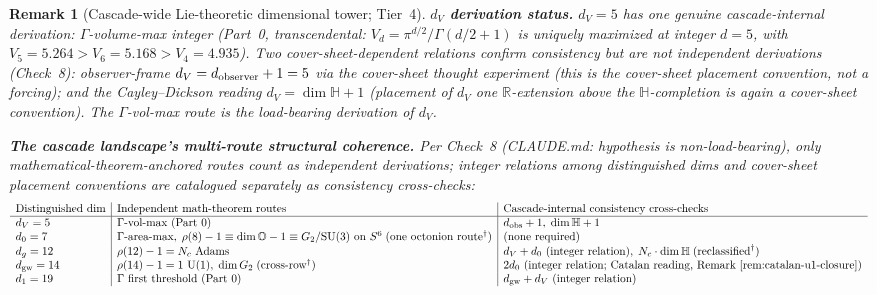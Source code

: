\documentclass[12pt,a4paper]{article}
\newtheorem*{remark}{Remark}
\begin{document}
\begin{remark}[Cascade-wide Lie-theoretic dimensional tower; Tier~4]
\medskip\noindent\textbf{$d_V$ derivation status.} $d_V = 5$ has one genuine cascade-internal derivation: $\Gamma$-volume-max integer (Part~0, transcendental: $V_d = \pi^{d/2}/\Gamma(d/2+1)$ is uniquely maximized at integer $d=5$, with $V_5 = 5.264 > V_6 = 5.168 > V_4 = 4.935$). Two cover-sheet-dependent relations confirm consistency but are \emph{not} independent derivations (Check~8): observer-frame $d_V = d_{\rm observer} + 1 = 5$ via the cover-sheet thought experiment (this is the cover-sheet placement convention, not a forcing); and the Cayley--Dickson reading $d_V = \dim\mathbb{H} + 1$ (placement of $d_V$ one $\mathbb{R}$-extension above the $\mathbb{H}$-completion is again a cover-sheet convention). The $\Gamma$-vol-max route is the load-bearing derivation of $d_V$.

\medskip\noindent\textbf{The cascade landscape's multi-route structural coherence.} Per Check~8 (CLAUDE.md: hypothesis is non-load-bearing), only mathematical-theorem-anchored routes count as \emph{independent} derivations; integer relations among distinguished dims and cover-sheet placement conventions are catalogued separately as \emph{consistency cross-checks}:
\[
\begin{array}{l|l|l}
\text{Distinguished dim} & \text{Independent math-theorem routes} & \text{Cascade-internal consistency cross-checks} \\
\hline
d_V = 5 & \Gamma\text{-vol-max (Part~0)} & d_{\rm obs}+1, \; \dim\mathbb{H}+1 \\
d_0 = 7 & \Gamma\text{-area-max}, \; \rho(8)-1 \equiv \dim\mathbb{O}-1 \equiv G_2/\mathrm{SU}(3) \text{ on } S^6 \; (\text{one octonion route}^{\dagger}) & \text{(none required)} \\
d_g = 12 & \rho(12)-1 = N_c \text{ Adams} & d_V + d_0 \text{ (integer relation)}, \; N_c\cdot\dim\mathbb{H} \; (\text{reclassified}^{\dagger}) \\
d_{\rm gw} = 14 & \rho(14)-1 = 1 \text{ U(1)}, \; \dim G_2 \; (\text{cross-row}^{\dagger}) & 2 d_0 \text{ (integer relation; Catalan reading, Remark~\ref{rem:catalan-u1-closure})} \\
d_1 = 19 & \Gamma \text{ first threshold (Part~0)} & d_{\rm gw} + d_V \text{ (integer relation)}
\end{array}
\]

\end{remark}
\end{document}
